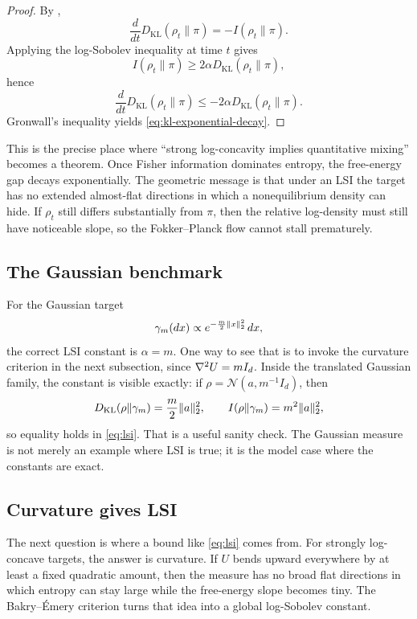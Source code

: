 \documentclass[11pt]{article}
\begin{document}
\begin{proof}
By ,
\[
\frac{d}{dt}D_{\mathrm{KL}}(\rho_t\|\pi)
=
-I(\rho_t\|\pi).
\]
Applying the log-Sobolev inequality at time $t$ gives
\[
I(\rho_t\|\pi)\ge 2\alpha D_{\mathrm{KL}}(\rho_t\|\pi),
\]
hence
\[
\frac{d}{dt}D_{\mathrm{KL}}(\rho_t\|\pi)
\le
-2\alpha D_{\mathrm{KL}}(\rho_t\|\pi).
\]
Gronwall's inequality yields \eqref{eq:kl-exponential-decay}.%
\end{proof}

This is the precise place where ``strong log-concavity implies quantitative mixing'' becomes a theorem.
Once Fisher information dominates entropy, the free-energy gap decays exponentially.
The geometric message is that under an LSI the target has no extended almost-flat directions in which a nonequilibrium density can hide.
If $\rho_t$ still differs substantially from $\pi$, then the relative log-density must still have noticeable slope, so the Fokker--Planck flow cannot stall prematurely.

\subsection{The Gaussian benchmark}
\label{subsec:gaussian-lsi}

For the Gaussian target
\[
\gamma_m(dx)\propto e^{-\frac{m}{2}\lVert x\rVert_2^2}\,dx,
\]
the correct LSI constant is $\alpha=m$.
One way to see that is to invoke the curvature criterion in the next subsection, since $\nabla^2 U=mI_d$.
Inside the translated Gaussian family, the constant is visible exactly:
if $\rho=\mathcal{N}(a,m^{-1}I_d)$, then
\[
D_{\mathrm{KL}}(\rho\|\gamma_m)=\frac{m}{2}\lVert a\rVert_2^2,
\qquad
I(\rho\|\gamma_m)=m^2\lVert a\rVert_2^2,
\]
so equality holds in \eqref{eq:lsi}.
That is a useful sanity check.
The Gaussian measure is not merely an example where LSI is true; it is the model case where the constants are exact.

\subsection{Curvature gives LSI}
\label{subsec:bakry-emery}

The next question is where a bound like \eqref{eq:lsi} comes from.
For strongly log-concave targets, the answer is curvature.
If $U$ bends upward everywhere by at least a fixed quadratic amount, then the measure has no broad flat directions in which entropy can stay large while the free-energy slope becomes tiny.
The Bakry--\'Emery criterion turns that idea into a global log-Sobolev constant.
\end{document}
